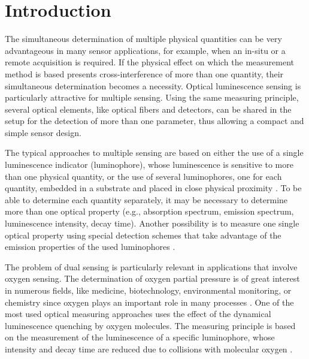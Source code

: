 \documentclass[final,5p,times,twocolumn]{elsarticle}
\begin{document}
\section{Introduction}
\label{Introduction}

The simultaneous determination of multiple physical quantities can be very advantageous in many sensor applications, for example, when an in-situ or a remote acquisition is required. 
If the physical effect on which the measurement method is based presents cross-interference of more than one quantity, their simultaneous determination becomes a necessity.
Optical luminescence sensing is particularly attractive for multiple sensing. Using the same measuring principle, several optical elements, like optical fibers and detectors, can be shared in the setup for the detection of more than one parameter, thus allowing a compact and simple sensor design.

The typical approaches to multiple sensing are based on either the use of a single luminescence indicator (luminophore), whose luminescence is sensitive to more than one physical quantity, or the use of several luminophores, one for each quantity, embedded in a substrate and placed in close physical proximity \cite{Stich2010,Borisov2011novel,Kameya2014,Wang2014,Santoro2016,Biring2019}. To be able to determine each quantity separately, it may be necessary to determine more than one optical property (e.g., absorption spectrum, emission spectrum, luminescence intensity, decay time). Another possibility is to measure one single optical property using special detection schemes that take advantage of the emission properties of the used luminophores \cite{Wang2014,Biring2019,Collier2013,Stehning2004,Jorge2008,Moore2006}. 

The problem of dual sensing is particularly relevant in applications that involve oxygen sensing. The determination of oxygen partial pressure is of great interest in numerous fields, like medicine, biotechnology, environmental monitoring, or chemistry since oxygen plays an important role in many processes \cite{Papkovsky2013,Wang2014}. One of the most used optical measuring approaches uses the effect of the dynamical luminescence quenching by oxygen molecules. The measuring principle is based on the measurement of the luminescence of a specific luminophore, whose intensity and decay time are reduced due to collisions with molecular oxygen \cite{Lakowicz2006}.
\end{document}

